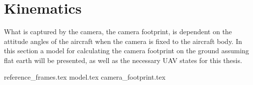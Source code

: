 \chapter{Kinematics}
\label{ch:kinematics}

What is captured by the camera, the camera footprint, is dependent on the attitude angles of the aircraft when the camera is fixed to the aircraft body. In this section a model for calculating the camera footprint on the ground assuming flat earth will be presented, as well as the necessary UAV states for this thesis.

{reference_frames.tex}
{model.tex}
{camera_footprint.tex}
